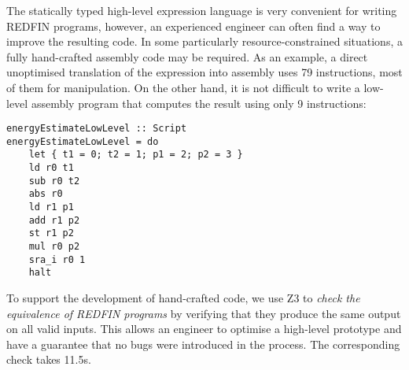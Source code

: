 The statically typed high-level expression language is very convenient for
writing REDFIN programs, however, an experienced engineer can often find a way
to improve the resulting code. In some particularly resource-constrained situations,
a fully hand-crafted assembly code may be required. As an example, a direct
unoptimised translation of the  expression into assembly uses
79 instructions, most of them for  manipulation.
On the other hand, it is not difficult to write a low-level assembly program that
computes the result using only 9 instructions:

\begin{verbatim}
energyEstimateLowLevel :: Script
energyEstimateLowLevel = do
    let { t1 = 0; t2 = 1; p1 = 2; p2 = 3 }
    ld r0 t1
    sub r0 t2
    abs r0
    ld r1 p1
    add r1 p2
    st r1 p2
    mul r0 p2
    sra_i r0 1
    halt
\end{verbatim}
\label{energyEstimateLowLevel}

\noindent
To support the development of hand-crafted code, we use Z3 to \emph{check the
equivalence of REDFIN programs} by verifying that they produce
the same output on all valid inputs. This allows an engineer to
optimise a high-level prototype and have a guarantee that no bugs were
introduced in the process. The corresponding  check takes 11.5s.




